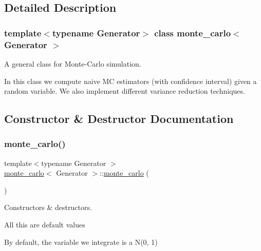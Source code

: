 \subsection{Detailed Description}
\subsubsection*{template$<$typename Generator$>$\newline
class monte\+\_\+carlo$<$ Generator $>$}

A general class for Monte-\/\+Carlo simulation. 

In this class we compute naive MC estimators (with confidence interval) given a random variable. We also implement different variance reduction techniques. 

\subsection{Constructor \& Destructor Documentation}
\mbox{\label{classmonte__carlo_a602098d8c4cd2400e8b6036a7526437d}} 
\subsubsection{\texorpdfstring{monte\+\_\+carlo()}{monte\_carlo()}\hspace{0.1cm}{\footnotesize\ttfamily [1/2]}}
{\footnotesize\ttfamily template$<$typename Generator $>$ \\
\mbox{\hyperlink{classmonte__carlo}{monte\+\_\+carlo}}$<$ Generator $>$\+::\mbox{\hyperlink{classmonte__carlo}{monte\+\_\+carlo}} (\begin{DoxyParamCaption}{ }\end{DoxyParamCaption})}



Constructors \& destructors. 

All this are default values

By default, the variable we integrate is a N(0, 1) \mbox{\label{classmonte__carlo_a3c7619083f106006f7549bfa21af0b70}} 
